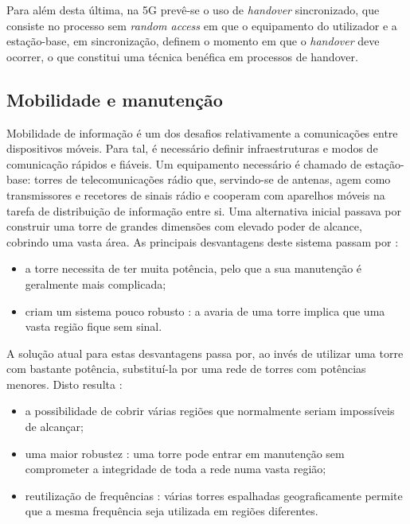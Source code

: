 \documentclass{llncs}
\begin{document}
Para além desta última, na 5G prevê-se o uso de \textit{handover} sincronizado, que consiste no processo sem \textit{random access} em que o equipamento do utilizador e a estação-base, em sincronização, definem o momento em que o \textit{handover} deve ocorrer, o que constitui uma técnica benéfica em processos de handover.

\subsection{Mobilidade e manutenção}
\hspace*{1.5em}Mobilidade de informação é um dos desafios relativamente a comunicações entre dispositivos móveis. Para tal, é necessário definir infraestruturas e modos de comunicação rápidos e fiáveis. Um equipamento necessário é chamado de estação-base: torres de telecomunicações rádio que, servindo-se de antenas, agem como transmissores e recetores de sinais rádio e cooperam com aparelhos móveis na tarefa de distribuição de informação entre si.
Uma alternativa inicial passava por construir uma torre de grandes dimensões com elevado poder de alcance, cobrindo uma vasta área. As principais desvantagens deste sistema passam por :
\begin{itemize}
    \item a torre necessita de ter muita potência, pelo que a sua manutenção é geralmente mais complicada;
    \item criam um sistema pouco robusto : a avaria de uma torre implica que uma vasta região fique sem sinal.
\end{itemize}

\hspace*{1.5em}A solução atual para estas desvantagens passa por, ao invés de utilizar uma torre com bastante potência, substituí-la por uma rede de torres com potências menores. Disto resulta :

\begin{itemize}
    \item a possibilidade de cobrir várias regiões que normalmente seriam impossíveis de alcançar;
    \item uma maior robustez : uma torre pode entrar em manutenção sem comprometer a integridade de toda a rede numa vasta região;
    \item reutilização de frequências : várias torres espalhadas geograficamente permite que a mesma frequência seja utilizada em regiões diferentes.
\end{itemize}
\end{document}
